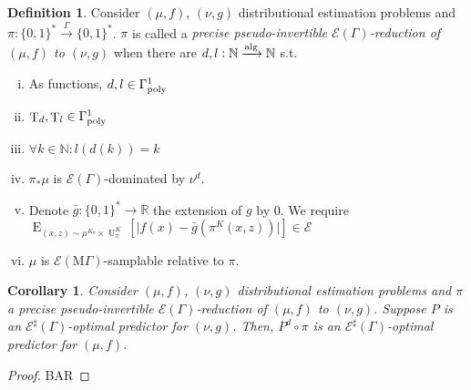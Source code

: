 \documentclass{article}
\numberwithin{equation}{section}
\theoremstyle{definition}
\newtheorem{definition}{Definition}[section]
\theoremstyle{plain}
\newtheorem{corollary}{Corollary}[section]
\newcommand{\Bool}{\{0,1\}}
\newcommand{\Words}{{\Bool^*}}
\DeclareMathOperator{\E}{E}
\DeclareMathOperator{\T}{T}
\DeclareMathOperator{\Un}{U}
\newcommand{\Nats}{\mathbb{N}}
\newcommand{\Reals}{\mathbb{R}}
\newcommand{\Abs}[1]{\lvert #1 \rvert}
\newcommand{\MGrow}{\mathrm{M}\Gamma}
\newcommand{\Fall}{\mathcal{E}}
\newcommand{\EG}{\Fall(\Gamma)}
\newcommand{\ESG}{\Fall^\sharp(\Gamma)}
\newcommand{\EMG}{\Fall(\MGrow)}
\newcommand{\Alg}{\xrightarrow{\textnormal{alg}}}
\newcommand{\Scheme}{\xrightarrow{\Gamma}}
\begin{document}
\begin{samepage}
\begin{definition}

Consider $(\mu,f)$, $(\nu,g)$ distributional estimation problems and ${\pi: \Words \Scheme \Words}$. $\pi$ is called a \emph{precise pseudo-invertible $\EG$-reduction of $(\mu,f)$ to $(\nu,g)$} when there are ${d,l: \Nats \Alg \Nats}$ s.t.

\begin{enumerate}[(i)]

\item As functions, ${d,l \in \Gamma_{\textnormal{poly}}^1}$

\item ${\T_d, \T_l \in \Gamma_{\textnormal{poly}}^1}$

\item $\forall k \in \Nats: l(d(k))=k$

\item\label{con:def__psp_reduce__dist} ${\pi_*\mu}$ is ${\EG}$-dominated by ${\nu^d}$.

\item\label{con:def__psp_reduce__fun} Denote ${\bar{g}: \Words \rightarrow \Reals}$ the extension of $g$ by 0. We require $\E_{(x,z) \sim \mu^{K_0} \times \Un_\pi^{K}}[\Abs{f(x)-\bar{g}(\pi^{K}(x,z))}] \in \Fall$

\item\label{con:def__psp_reduce__smp} $\mu$ is $\EMG$-samplable relative to $\pi$.

\end{enumerate}

\end{definition}
\end{samepage}

\begin{samepage}
\begin{corollary}

Consider $(\mu,f)$, $(\nu,g)$ distributional estimation problems and $\pi$ a precise pseudo-invertible $\EG$-reduction of $(\mu, f)$ to $(\nu, g)$. Suppose $P$ is an $\ESG$-optimal predictor for $(\nu, g)$. Then, $P^d \circ \pi$ is an $\ESG$-optimal predictor for $(\mu, f)$.

\end{corollary}
\end{samepage}

\begin{proof}

BAR
%
\end{proof}
\end{document}
